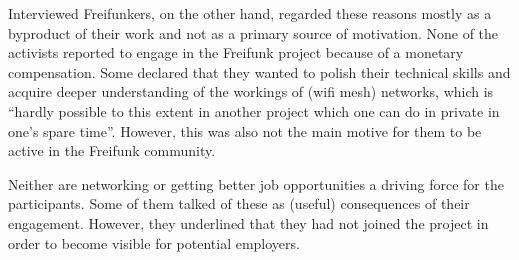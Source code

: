\begin{comment}
Lakhani and Wolf:
oder
17.5%
11.0%
\end{comment}

Interviewed Freifunkers, on the other hand, regarded these reasons mostly as a byproduct of their work and not as a primary source of motivation.
None of the activists reported to engage in the Freifunk project because of a monetary compensation.
Some declared that they wanted to polish their technical skills and acquire deeper understanding of the workings of (wifi mesh) networks, which is ``hardly possible to this extent in another project which one can do in private in one's spare time''.
However, this was also not the main motive for them to be active in the Freifunk community.

Neither are networking or getting better job opportunities a driving force for the participants.
Some of them talked of these as (useful) consequences of their engagement.
However, they underlined that they had not joined the project in order to become visible for potential employers.



